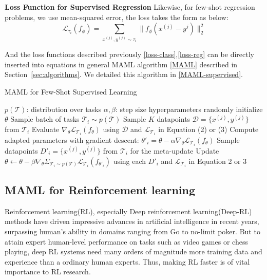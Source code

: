 \textbf{Loss Function for Supervised Regression}
Likewise, for few-shot regression problems, we use mean-squared error, the loss takes the form as below: 
\begin{equation}
    \label{loss-reg}
    \mathcal{L}_{\tau_i}(f_\phi) = \sum_{x^{(j)},y^{(j)}\sim\tau_i} \parallel f_\phi(x^{(j)} - y^{j})\parallel_2^2 
    \tag{4}
\end{equation}

And the loss functions described previously \ref{loss-class},\ref{loss-reg} can be directly inserted into equations in general MAML algorithm \ref{MAML} described in Section~\ref{sec:algorithms}.
We detailed this algorithm in \ref{MAML-supervised}.

\begin{algorithm}
  \caption{MAML for Few-Shot Supervised Learning}
  \label{MAML-supervised}
  \begin{algorithmic}[1]
    \REQUIRE $p(\mathcal{T})$: distribution over tasks
    \REQUIRE $\alpha, \beta$: step size hyperparameters
    \STATE randomly initialize $\theta$
    \STATE Sample batch of tasks $\mathcal{T}_i \sim p(\mathcal{T})$
    \STATE Sample $K$ datapoints $\mathcal{D}=\{x^{(j)}, y^{(j)}\}$ from $\mathcal{T}_i$
    \STATE Evaluate $\nabla_\theta \mathcal{L}_{\mathcal{T}_i} (f_\theta)$ using $\mathcal{D}$ and $\mathcal{L}_{\mathcal{T}_i}$ in Equation (2) or (3)
    \STATE Compute adapted parameters with gradient descent: $\theta'_i = \theta - \alpha\nabla_\theta \mathcal{L}_{\mathcal{T}_i} (f_\theta)$
    \STATE Sample datapoints $D'_i=\{x^{(j)}, y^{(j)}\}$ from $\mathcal{T}_i$ for the meta-update
    \ENDFOR
    \STATE Update $\theta \leftarrow \theta - \beta\nabla_\theta \Sigma_{\mathcal{T}_i \sim p(\mathcal{T})}\mathcal{L}_{\mathcal{T}_i} (f_{\theta'_i})$ using each $D'_i$ and $\mathcal{L}_{\mathcal{T}_i} $ in Equation 2 or 3
    \ENDWHILE
  \end{algorithmic}
\end{algorithm}


\subsection{MAML for Reinforcement learning}
Reinforcement learning(RL), especially Deep reinforcement learning(Deep-RL) methods have driven impressive advances in artificial intelligence in recent years, surpassing human's ability in domains ranging from Go to no-limit poker. But to attain expert human-level performance on tasks such as video games or chess playing, deep RL systems need many orders of magnitude more training data and experience than a ordinary human experts. Thus, making RL faster is of vital importance to RL research.


